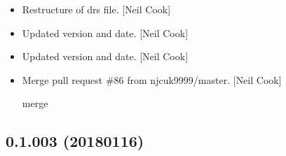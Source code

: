 \documentclass[a4paper,10pt,english]{report}
\begin{document}
\begin{itemize}
\item {} 
Restructure of drs file. {[}Neil Cook{]}

\item {} 
Updated version and date. {[}Neil Cook{]}

\item {} 
Updated version and date. {[}Neil Cook{]}

\item {} 
Merge pull request \#86 from njcuk9999/master. {[}Neil Cook{]}

merge

\end{itemize}


\subsection{0.1.003 (2018\sphinxhyphen{}01\sphinxhyphen{}16)}
\end{document}
